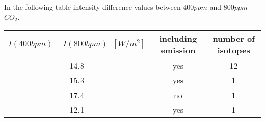 In the following table intensity difference values between $400 ppm$ and $800 ppm$ $CO_2$. 
\newline
\newline
\begin{tabular}{|c |c |c |}
	\hline
	$I(400 bpm) - I(800 bpm) \;\; [W/m^2]$ & including emission & number of isotopes \\
	\hline
	14.8                                     & yes      &  12         \\
	15.3                                     & yes      &  1          \\
	17.4                                     & no       &  1          \\
	12.1                                     & yes      &  1       \\
	\hline   
\end{tabular}  

